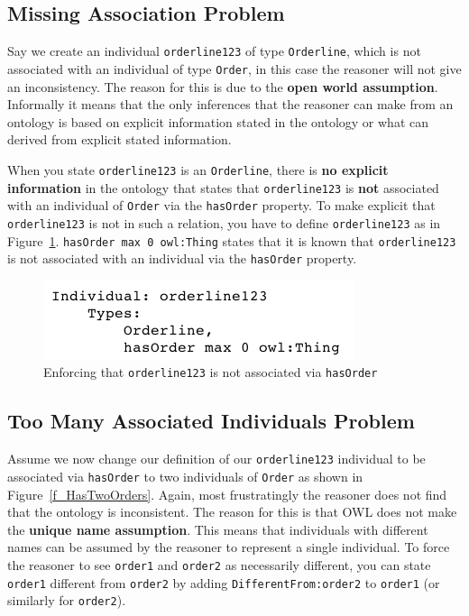 \documentclass{amsart}
\begin{document}
  \subsection{Missing Association Problem}
  Say we create an individual \texttt{orderline123} of type \texttt{Orderline}, which is not associated with an individual of type \texttt{Order}, in this case the reasoner will not give an inconsistency. The reason for this is due to the \textbf{open world assumption}. Informally it means that the only inferences that the reasoner can make from an ontology is based on explicit information stated in the ontology or what can derived from explicit stated information. 
  
  When you state \texttt{orderline123} is an \texttt{Orderline}, there is \textbf{no explicit information} in the ontology that states that \texttt{orderline123} is \textbf{not} associated with an individual of \texttt{Order} via the \texttt{hasOrder} property. To make explicit that \texttt{orderline123} is not in such a relation, you have to define \texttt{orderline123} as in Figure~\ref{f_HasNoOrder}. \texttt{hasOrder max 0 owl:Thing} states that it is known that \texttt{orderline123} is not associated with an individual via the \texttt{hasOrder} property.
 
    \begin{figure}
      \centering \includegraphics[trim = 0mm 0mm 0mm 0mm, clip, scale=0.5]{./HasNoOrder.png}
      \vspace{-3mm}
      \caption{Enforcing that \texttt{orderline123} is not associated via \texttt{hasOrder}}\label{f_HasNoOrder}
    \end{figure}
    
  \subsection{Too Many Associated Individuals Problem}
  Assume we now change our definition of our \texttt{orderline123} individual to be associated via \texttt{hasOrder} to two individuals of \texttt{Order} as shown in Figure~\ref{f_HasTwoOrders}. Again, most frustratingly the reasoner does not find that the ontology is inconsistent. The reason for this is that OWL does not make the \textbf{unique name assumption}. This means that individuals with different names can be assumed by the reasoner to represent a single individual. To force the reasoner to see \texttt{order1} and \texttt{order2} as necessarily different, you can state \texttt{order1} different from \texttt{order2} by adding \texttt{DifferentFrom:order2} to \texttt{order1} (or similarly for \texttt{order2}).
\end{document}
